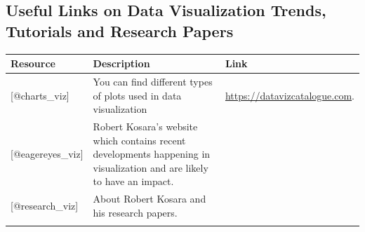 \documentclass[]{book}
\theoremstyle{definition}
\theoremstyle{definition}
\theoremstyle{definition}
\theoremstyle{remark}
\begin{document}
\subsection{Useful Links on Data Visualization Trends, Tutorials and
Research
Papers}\label{useful-links-on-data-visualization-trends-tutorials-and-research-papers}

\begin{longtable}[]{@{}lll@{}}
\toprule
\begin{minipage}[b]{0.15\columnwidth}\raggedright\strut
\textbf{Resource}\strut
\end{minipage} & \begin{minipage}[b]{0.28\columnwidth}\raggedright\strut
\textbf{Description}\strut
\end{minipage} & \begin{minipage}[b]{0.48\columnwidth}\raggedright\strut
\textbf{Link}\strut
\end{minipage}\tabularnewline
\midrule
\endhead
\begin{minipage}[t]{0.15\columnwidth}\raggedright\strut
{[}@charts\_viz{]}\strut
\end{minipage} & \begin{minipage}[t]{0.28\columnwidth}\raggedright\strut
You can find different types of plots used in data visualization\strut
\end{minipage} & \begin{minipage}[t]{0.48\columnwidth}\raggedright\strut
\href{https://datavizcatalogue.com/search.html}{https://datavizcatalogue.com}.\strut
\end{minipage}\tabularnewline
\begin{minipage}[t]{0.15\columnwidth}\raggedright\strut
{[}@eagereyes\_viz{]}\strut
\end{minipage} & \begin{minipage}[t]{0.28\columnwidth}\raggedright\strut
Robert Kosara's website which contains recent developments happening in
visualization and are likely to have an impact.\strut
\end{minipage}\tabularnewline
\begin{minipage}[t]{0.15\columnwidth}\raggedright\strut
{[}@research\_viz{]}\strut
\end{minipage} & \begin{minipage}[t]{0.28\columnwidth}\raggedright\strut
About Robert Kosara and his research papers.\strut
\end{minipage}\tabularnewline
\begin{minipage}[t]{0.15\columnwidth}\raggedright\strut

\end{minipage}
\end{longtable}
\end{document}
